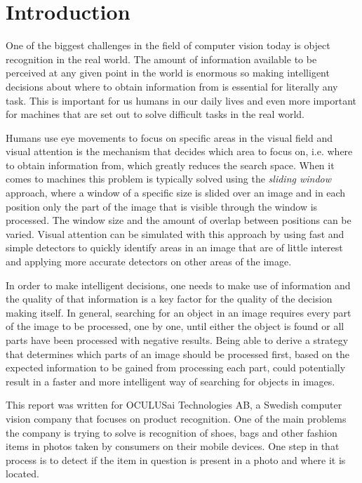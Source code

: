 
\pagestyle{newchap}

\chapter{Introduction}
One of the biggest challenges in the field of computer vision today is object recognition in the real world. The amount of information available to be perceived at any given point in the world is enormous so making intelligent decisions about where to obtain information from is essential for literally any task. This is important for us humans in our daily lives and even more important for machines that are set out to solve difficult tasks in the real world.

Humans use eye movements to focus on specific areas in the visual field and visual attention is the mechanism that decides which area to focus on, i.e. where to obtain information from, which greatly reduces the search space. When it comes to machines this problem is typically solved using the \emph{sliding window} approach, where a window of a specific size is slided over an image and in each position only the part of the image that is visible through the window is processed. The window size and the amount of overlap between positions can be varied. Visual attention can be simulated with this approach by using fast and simple detectors to quickly identify areas in an image that are of little interest and applying more accurate detectors on other areas of the image.

In order to make intelligent decisions, one needs to make use of information and the quality of that information is a key factor for the quality of the decision making itself. In general, searching for an object in an image requires every part of the image to be processed, one by one, until either the object is found or all parts have been processed with negative results. Being able to derive a strategy that determines which parts of an image should be processed first, based on the expected information to be gained from processing each part, could potentially result in a faster and more intelligent way of searching for objects in images.

This report was written for OCULUSai Technologies AB, a Swedish computer vision company that focuses on product recognition. One of the main problems the company is trying to solve is recognition of shoes, bags and other fashion items in photos taken by consumers on their mobile devices. One step in that process is to detect if the item in question is present in a photo and where it is located.

